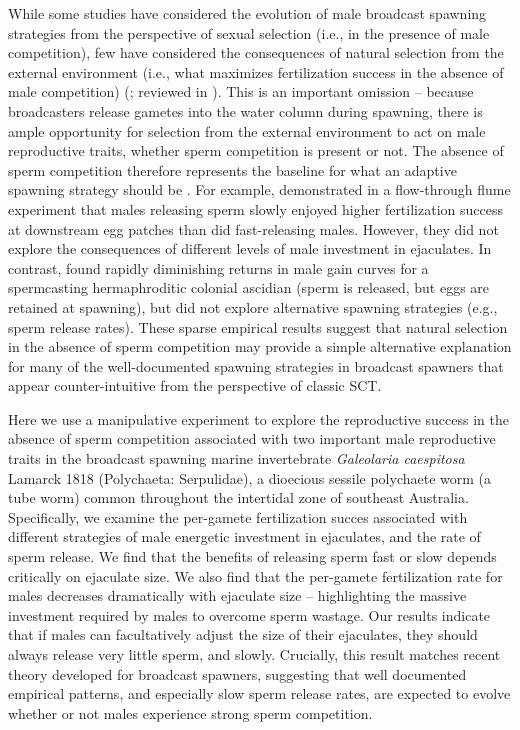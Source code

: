 \documentclass{article}
\begin{document}
While some studies have considered the evolution of male broadcast spawning strategies from the perspective of sexual selection (i.e., in the presence of male competition), few have considered the consequences of natural selection from the external environment (i.e., what maximizes fertilization success in the absence of male competition) (\citealt{Levitan2005}; reviewed in \citealt{LotterhosLevitan2011}). This is an important omission -- because broadcasters release gametes into the water column during spawning, there is ample opportunity for selection from the external environment to act on male reproductive traits, whether sperm competition is present or not. The absence of sperm competition therefore represents the baseline for what an adaptive spawning strategy should be \citep{MarshallBolton2007}. For example, \citet{MarshallBolton2007} demonstrated in a flow-through flume experiment that males releasing sperm slowly enjoyed higher fertilization success at downstream egg patches than did fast-releasing males. However, they did not explore the consequences of different levels of male investment in ejaculates. In contrast, \citet{JohnsonYund2009} found rapidly diminishing returns in male gain curves for a spermcasting hermaphroditic colonial ascidian (sperm is released, but eggs are retained at spawning), but did not explore alternative spawning strategies (e.g., sperm release rates). These sparse empirical results suggest that natural selection in the absence of sperm competition may provide a simple alternative explanation for many of the well-documented spawning strategies in broadcast spawners that appear counter-intuitive from the perspective of classic SCT. 

Here we use a manipulative experiment to explore the reproductive success in the absence of sperm competition associated with two important male reproductive traits in the broadcast spawning marine invertebrate \textit{Galeolaria caespitosa} Lamarck 1818 (Polychaeta: Serpulidae), a dioecious sessile polychaete worm (a tube worm) common throughout the intertidal zone of southeast Australia. Specifically, we examine the per-gamete fertilization succes associated with different strategies of male energetic investment in ejaculates, and the rate of sperm release. We find that the benefits of releasing sperm fast or slow depends critically on ejaculate size. We also find that the per-gamete fertilization rate for males decreases dramatically with ejaculate size -- highlighting the massive investment required by males to overcome sperm wastage. Our results indicate that if males can facultatively adjust the size of their ejaculates, they should always release very little sperm, and slowly. Crucially, this result matches recent theory developed for broadcast spawners, suggesting that well documented empirical patterns, and especially slow sperm release rates, are expected to evolve whether or not males experience strong sperm competition.
\end{document}
